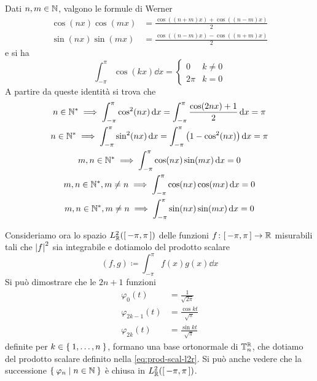 	Dati \(n, m \in \mathbb{N}\), valgono le formule di Werner
		\begin{align*}
			\cos (n x) \cos (m x) &= \frac{\cos ((n + m) x) + \cos ((n - m) x)}{2} \\
			\sin (n x) \sin (m x) &= \frac{\cos ((n - m) x) - \cos ((n + m) x)}{2}
		\end{align*}
	e si ha
	\begin{equation*}
		\int_{- \pi}^\pi \cos (k x) \dd{x} =
		\begin{cases}
			0     & k \ne 0 \\
			2 \pi & k = 0
		\end{cases}
	\end{equation*}
	A partire da queste identità si trova che
		\begin{gather*}
			n \in \mathbb{N}^* \implies \int_{- \pi}^\pi \cos^2 (n x) \dd{x} = \int_{- \pi}^\pi \frac{\cos (2 n x) + 1}{2} \dd{x} = \pi \\
			n \in \mathbb{N}^* \implies \int_{- \pi}^\pi \sin^2 (n x) \dd{x} = \int_{- \pi}^\pi \qty(1 - \cos^2 (n x)) \dd{x} = \pi \\
			m, n \in \mathbb{N}^* \implies \int_{- \pi}^\pi \cos (n x) \sin (m x) \dd{x} = 0 \\
			m, n \in \mathbb{N}^*, m \ne n \implies \int_{- \pi}^\pi \cos (n x) \cos (m x) \dd{x} = 0 \\
			m, n \in \mathbb{N}^*, m \ne n \implies \int_{- \pi}^\pi \sin (n x) \sin (m x) \dd{x} = 0
		\end{gather*}

	Consideriamo ora lo spazio \(L^2_\mathbb{R} ([\,- \pi, \pi \,])\) delle funzioni \(f \colon [\,- \pi, \pi \,] \to \mathbb{R}\) misurabili tali che \(\abs{f}^2\) sia integrabile e dotiamolo del prodotto scalare
	\begin{equation}\label{eq:prod-scal-l2r}
		(f, g) \coloneqq \int_{- \pi}^\pi f (x) g (x) \dd{x}
	\end{equation}
	Si può dimostrare che le \(2 n + 1\) funzioni
	\begin{subequations}\label{eq:polin-trig-reali-normalizzati}
		\begin{align}
			\varphi_0 (t)         & = \frac{1}{\sqrt{2 \pi}}      \\
			\varphi_{2 k - 1} (t) & = \frac{\cos k t}{\sqrt{\pi}} \\
			\varphi_{2 k} (t)     & = \frac{\sin k t}{\sqrt{\pi}}
		\end{align}
	\end{subequations}
	definite per \(k \in \Set{1, \dots, n}\), formano una base ortonormale di \(\mathbb{T}_n^\mathbb{R}\), che dotiamo del prodotto scalare definito nella \eqref{eq:prod-scal-l2r}. Si può anche vedere che la successione \(\Set{\varphi_n | n \in \mathbb{N}}\) è chiusa in \(L^2_\mathbb{R} ([\,- \pi, \pi \,])\).
	
